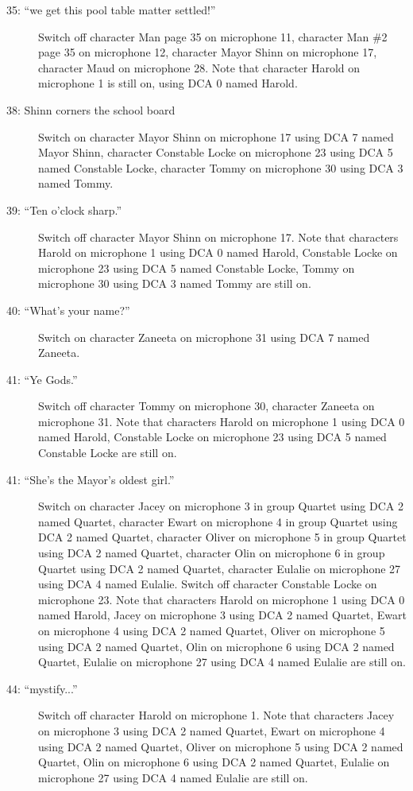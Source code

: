 \begin{description}
\item[35: ``we get this pool table matter settled!'']
Switch off character Man page 35 on microphone 11, character Man \#2 page 35 on microphone 12, character Mayor Shinn on microphone 17, character Maud on microphone 28. Note that character Harold on microphone 1 is still on, using DCA 0 named Harold.

\item[38: Shinn corners the school board]
Switch on character Mayor Shinn on microphone 17 using DCA 7 named Mayor Shinn, character Constable Locke on microphone 23 using DCA 5 named Constable Locke, character Tommy on microphone 30 using DCA 3 named Tommy. 

\item[39: ``Ten o'clock sharp.'']
Switch off character Mayor Shinn on microphone 17. Note that characters Harold on microphone 1 using DCA 0 named Harold, Constable Locke on microphone 23 using DCA 5 named Constable Locke, Tommy on microphone 30 using DCA 3 named Tommy are still on.  

\item[40: ``What's your name?'']
Switch on character Zaneeta on microphone 31 using DCA 7 named Zaneeta. 

\item[41: ``Ye Gods.'']
Switch off character Tommy on microphone 30, character Zaneeta on microphone 31. Note that characters Harold on microphone 1 using DCA 0 named Harold, Constable Locke on microphone 23 using DCA 5 named Constable Locke are still on.  

\item[41: ``She's the Mayor's oldest girl.'']
Switch on character Jacey on microphone 3 in group Quartet using DCA 2 named Quartet, character Ewart on microphone 4 in group Quartet using DCA 2 named Quartet, character Oliver on microphone 5 in group Quartet using DCA 2 named Quartet, character Olin on microphone 6 in group Quartet using DCA 2 named Quartet, character Eulalie on microphone 27 using DCA 4 named Eulalie. Switch off character Constable Locke on microphone 23. Note that characters Harold on microphone 1 using DCA 0 named Harold, Jacey on microphone 3 using DCA 2 named Quartet, Ewart on microphone 4 using DCA 2 named Quartet, Oliver on microphone 5 using DCA 2 named Quartet, Olin on microphone 6 using DCA 2 named Quartet, Eulalie on microphone 27 using DCA 4 named Eulalie are still on.  

\item[44: ``mystify...'']
Switch off character Harold on microphone 1. Note that characters Jacey on microphone 3 using DCA 2 named Quartet, Ewart on microphone 4 using DCA 2 named Quartet, Oliver on microphone 5 using DCA 2 named Quartet, Olin on microphone 6 using DCA 2 named Quartet, Eulalie on microphone 27 using DCA 4 named Eulalie are still on.  


\end{description}

